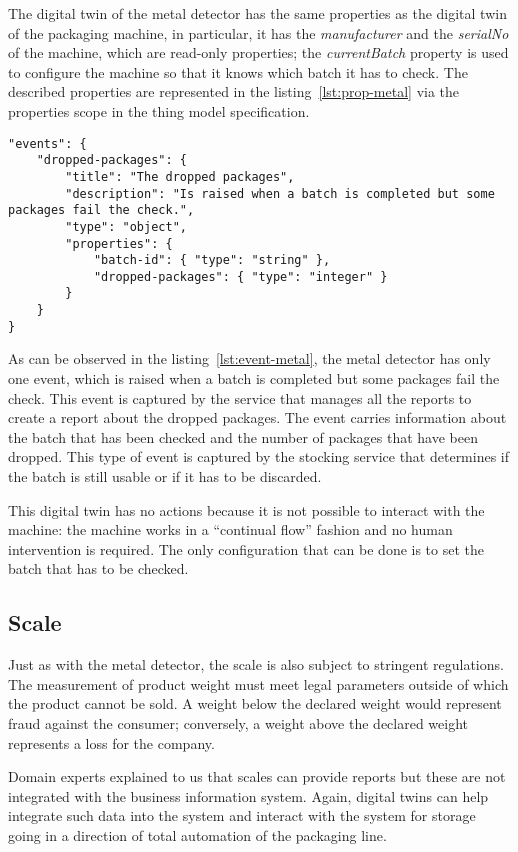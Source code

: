 The digital twin of the metal detector has the same properties as the digital twin of the packaging machine, in particular, it has the \textit{manufacturer} and the \textit{serialNo} of the machine, which are read-only properties; the \textit{currentBatch} property is used to configure the machine so that it knows which batch it has to check. The described properties are represented in the listing~\ref{lst:prop-metal} via the properties
scope in the thing model specification.

\begin{lstlisting}[caption={Events of the metal detector Thing Model.},label={lst:event-metal}]
"events": {
	"dropped-packages": {
		"title": "The dropped packages",
		"description": "Is raised when a batch is completed but some packages fail the check.",
		"type": "object",
		"properties": {
			"batch-id": { "type": "string" },
			"dropped-packages": { "type": "integer" }
		}
	}
}
\end{lstlisting}

As can be observed in the listing~\ref{lst:event-metal}, the metal detector has only one event, which is raised when a batch is completed but some packages fail the check. This event is captured by the service that manages all the reports to create a report about the dropped packages.
The event carries information about the batch that has been checked and the number of packages that have been dropped.
This type of event is captured by the stocking service that determines if the batch is still usable or if it has to be discarded.

This digital twin has no actions because it is not possible to interact with the machine: the machine works in a ``continual flow'' fashion and no human intervention is required. The only configuration that can be done is to set the batch that has to be checked.

\subsection{Scale}
Just as with the metal detector, the scale is also subject to stringent regulations. The measurement of product weight must meet legal parameters
outside of which the product cannot be sold.
A weight below the declared weight would represent fraud against the consumer; conversely, a weight above the declared weight represents a loss for the company.

Domain experts explained to us that scales can provide reports but these are not integrated with the business information system. Again, digital 
twins can help integrate such data into the system and interact with the system for storage going in a direction of total automation of the packaging
line.


